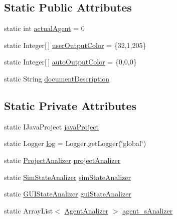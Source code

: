 \subsection*{Static Public Attributes}
\begin{DoxyCompactItemize}
\item 
static int \hyperlink{classit_1_1isislab_1_1masonhelperdocumentation_1_1analizer_1_1_global_utility_a8106b6699b9c7834ead4fc38d62a2575}{actual\-Agent} = 0
\item 
static Integer\mbox{[}$\,$\mbox{]} \hyperlink{classit_1_1isislab_1_1masonhelperdocumentation_1_1analizer_1_1_global_utility_aec864cd710b27ece609c5a6093211ff4}{user\-Output\-Color} = \{32,1,205\}
\item 
static Integer\mbox{[}$\,$\mbox{]} \hyperlink{classit_1_1isislab_1_1masonhelperdocumentation_1_1analizer_1_1_global_utility_a42aa676ad1ff27c42cd4aab651ff2a35}{auto\-Output\-Color} = \{0,0,0\}
\item 
static String \hyperlink{classit_1_1isislab_1_1masonhelperdocumentation_1_1analizer_1_1_global_utility_a9fa993a13ffdd61608e1d097db234e17}{document\-Description}
\end{DoxyCompactItemize}
\subsection*{Static Private Attributes}
\begin{DoxyCompactItemize}
\item 
static I\-Java\-Project \hyperlink{classit_1_1isislab_1_1masonhelperdocumentation_1_1analizer_1_1_global_utility_a7c812f3b329b2e16cfff9da4b2b1efb3}{java\-Project}
\item 
static Logger \hyperlink{classit_1_1isislab_1_1masonhelperdocumentation_1_1analizer_1_1_global_utility_afc01085ddd5741383afdb4237343c49c}{log} = Logger.\-get\-Logger(\char`\"{}global\char`\"{})
\item 
static \hyperlink{classit_1_1isislab_1_1masonhelperdocumentation_1_1analizer_1_1_project_analizer}{Project\-Analizer} \hyperlink{classit_1_1isislab_1_1masonhelperdocumentation_1_1analizer_1_1_global_utility_a75c0f332c2911f6456e193d32dcb4a11}{project\-Analizer}
\item 
static \hyperlink{classit_1_1isislab_1_1masonhelperdocumentation_1_1analizer_1_1_sim_state_analizer}{Sim\-State\-Analizer} \hyperlink{classit_1_1isislab_1_1masonhelperdocumentation_1_1analizer_1_1_global_utility_a4ed7ab5249d920545c5081d813ef1029}{sim\-State\-Analizer}
\item 
static \hyperlink{classit_1_1isislab_1_1masonhelperdocumentation_1_1analizer_1_1_g_u_i_state_analizer}{G\-U\-I\-State\-Analizer} \hyperlink{classit_1_1isislab_1_1masonhelperdocumentation_1_1analizer_1_1_global_utility_a0104f618583fd4e003dcc2b40ba5b8e8}{gui\-State\-Analizer}
\item 
static Array\-List$<$ \hyperlink{classit_1_1isislab_1_1masonhelperdocumentation_1_1analizer_1_1_agent_analizer}{Agent\-Analizer} $>$ \hyperlink{classit_1_1isislab_1_1masonhelperdocumentation_1_1analizer_1_1_global_utility_a82af8b91f98c70ad25d504cc16e424b9}{agent\-\_\-s\-Analizer}
\end{DoxyCompactItemize}


